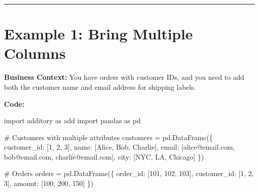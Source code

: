 \documentclass[
  letterpaper,
]{scrbook}
\newenvironment{Shaded}{\begin{snugshade}}{\end{snugshade}}
\newcommand{\CommentTok}[1]{\textcolor[rgb]{0.37,0.37,0.37}{#1}}
\newcommand{\DecValTok}[1]{\textcolor[rgb]{0.68,0.00,0.00}{#1}}
\newcommand{\ImportTok}[1]{\textcolor[rgb]{0.00,0.46,0.62}{#1}}
\newcommand{\NormalTok}[1]{\textcolor[rgb]{0.00,0.23,0.31}{#1}}
\newcommand{\OperatorTok}[1]{\textcolor[rgb]{0.37,0.37,0.37}{#1}}
\newcommand{\StringTok}[1]{\textcolor[rgb]{0.13,0.47,0.30}{#1}}
\begin{document}
\begin{center}\rule{0.5\linewidth}{0.5pt}\end{center}

\section{Example 1: Bring Multiple
Columns}\label{example-1-bring-multiple-columns}

\textbf{Business Context:} You have orders with customer IDs, and you
need to add both the customer name and email address for shipping
labels.

\textbf{Code:}

\begin{Shaded}
\begin{Highlighting}[]
\ImportTok{import}\NormalTok{ additory }\ImportTok{as}\NormalTok{ add}
\ImportTok{import}\NormalTok{ pandas }\ImportTok{as}\NormalTok{ pd}

\CommentTok{\# Customers with multiple attributes}
\NormalTok{customers }\OperatorTok{=}\NormalTok{ pd.DataFrame(\{}
    \StringTok{\textquotesingle{}customer\_id\textquotesingle{}}\NormalTok{: [}\DecValTok{1}\NormalTok{, }\DecValTok{2}\NormalTok{, }\DecValTok{3}\NormalTok{],}
    \StringTok{\textquotesingle{}name\textquotesingle{}}\NormalTok{: [}\StringTok{\textquotesingle{}Alice\textquotesingle{}}\NormalTok{, }\StringTok{\textquotesingle{}Bob\textquotesingle{}}\NormalTok{, }\StringTok{\textquotesingle{}Charlie\textquotesingle{}}\NormalTok{],}
    \StringTok{\textquotesingle{}email\textquotesingle{}}\NormalTok{: [}\StringTok{\textquotesingle{}alice@email.com\textquotesingle{}}\NormalTok{, }\StringTok{\textquotesingle{}bob@email.com\textquotesingle{}}\NormalTok{, }\StringTok{\textquotesingle{}charlie@email.com\textquotesingle{}}\NormalTok{],}
    \StringTok{\textquotesingle{}city\textquotesingle{}}\NormalTok{: [}\StringTok{\textquotesingle{}NYC\textquotesingle{}}\NormalTok{, }\StringTok{\textquotesingle{}LA\textquotesingle{}}\NormalTok{, }\StringTok{\textquotesingle{}Chicago\textquotesingle{}}\NormalTok{]}
\NormalTok{\})}

\CommentTok{\# Orders}
\NormalTok{orders }\OperatorTok{=}\NormalTok{ pd.DataFrame(\{}
    \StringTok{\textquotesingle{}order\_id\textquotesingle{}}\NormalTok{: [}\DecValTok{101}\NormalTok{, }\DecValTok{102}\NormalTok{, }\DecValTok{103}\NormalTok{],}
    \StringTok{\textquotesingle{}customer\_id\textquotesingle{}}\NormalTok{: [}\DecValTok{1}\NormalTok{, }\DecValTok{2}\NormalTok{, }\DecValTok{3}\NormalTok{],}
    \StringTok{\textquotesingle{}amount\textquotesingle{}}\NormalTok{: [}\DecValTok{100}\NormalTok{, }\DecValTok{200}\NormalTok{, }\DecValTok{150}\NormalTok{]}
\NormalTok{\})}


\end{Highlighting}
\end{Shaded}
\end{document}

